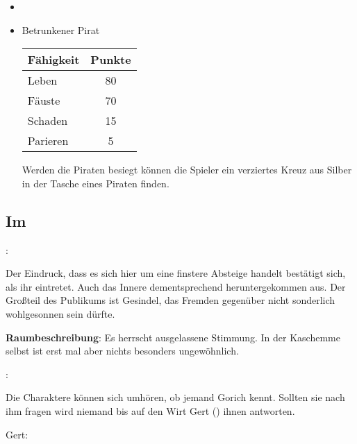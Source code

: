 \begin{itemize}
  \item {} \\
  \item \textbf{} Betrunkener Pirat \\
\begin{center}
  \begin{tabular}{lc}
    \toprule
    Fähigkeit & Punkte \\
    \midrule
    Leben & 80 \\
    Fäuste & 70 \\
    Schaden & 15 \\
    Parieren & 5 \\
    \bottomrule
  \end{tabular}
\end{center}

Werden die Piraten besiegt können die Spieler ein verziertes Kreuz aus Silber in der Tasche eines Piraten finden.

\end{itemize}

\subsection*{Im }
\label{imhund}

:

Der Eindruck, dass es sich hier um eine finstere Absteige handelt bestätigt sich, als ihr eintretet. Auch das Innere dementsprechend heruntergekommen aus. Der Großteil des Publikums ist Gesindel, das Fremden gegenüber nicht sonderlich wohlgesonnen sein dürfte.

\textbf{Raumbeschreibung}: Es herrscht ausgelassene Stimmung. In der Kaschemme selbst ist erst mal aber nichts besonders ungewöhnlich.

:

Die Charaktere können sich umhören, ob jemand Gorich kennt. Sollten sie nach ihm fragen wird niemand bis auf den Wirt Gert (\blue{\ref{Gert}}) ihnen antworten.

Gert: 

